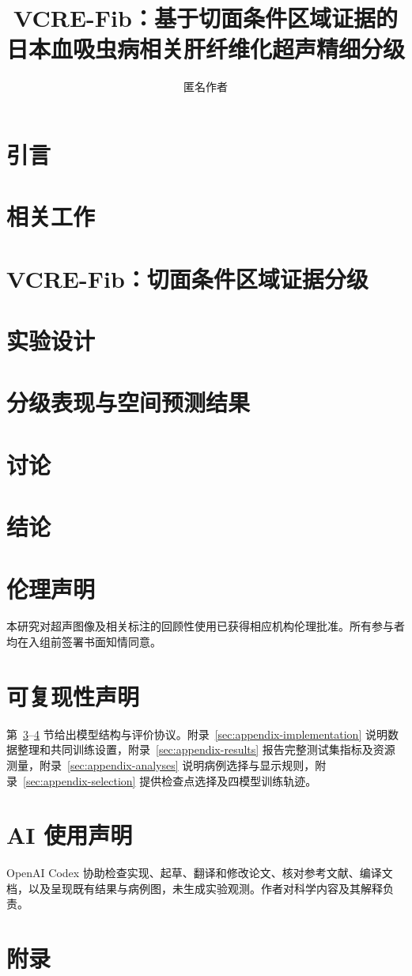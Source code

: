 \documentclass{article}
\title{VCRE-Fib：基于切面条件区域证据的\newline 日本血吸虫病相关肝纤维化超声精细分级}
\author{匿名作者}
\begin{document}
\maketitle
\begin{abstract}

\end{abstract}
\section{引言}\label{sec:introduction}


\section{相关工作}\label{sec:related}

\section{VCRE-Fib：切面条件区域证据分级}\label{sec:method}

\section{实验设计}\label{sec:setup}

\section{分级表现与空间预测结果}\label{sec:results}

\section{讨论}\label{sec:discussion}

\section{结论}\label{sec:conclusion}

\label{main-text-end}
\clearpage
\section*{伦理声明}\label{post-main-start}
本研究对超声图像及相关标注的回顾性使用已获得相应机构伦理批准。所有参与者均在入组前签署书面知情同意。
\section*{可复现性声明}
第~\ref{sec:method}--\ref{sec:setup} 节给出模型结构与评价协议。附录~\ref{sec:appendix-implementation} 说明数据整理和共同训练设置，附录~\ref{sec:appendix-results} 报告完整测试集指标及资源测量，附录~\ref{sec:appendix-analyses} 说明病例选择与显示规则，附录~\ref{sec:appendix-selection} 提供检查点选择及四模型训练轨迹。
\section*{AI 使用声明}
OpenAI Codex 协助检查实现、起草、翻译和修改论文、核对参考文献、编译文档，以及呈现既有结果与病例图，未生成实验观测。作者对科学内容及其解释负责。


\section*{附录}
\label{appendix-start}

\end{document}
